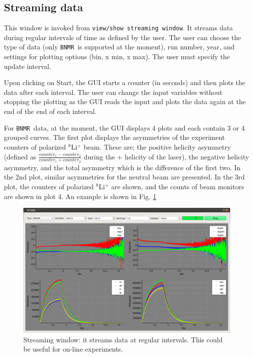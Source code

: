 \documentclass[10pt,letterpaper,oneside]{article}
\newcommand{\bnmrg}{\texttt{BNMR}}
\newcommand{\fig}[1]{Fig. \ref{#1}}
\begin{document}
\newpage
\subsection{Streaming data}\label{Streaming data}
 This window is invoked from \verb+view/show streaming window+.
 It streams data during regular intervals of time as defined by the user.
The user can choose the type of data (only \bnmrg\ is supported at the moment), run number, year, and settings for plotting options (bin, x min, x max).
The user must specify the update interval.

Upon clicking on Start, the GUI starts a counter (in seconds) and then 
plots the data after each interval. The user can change the input variables without stopping the plotting as the GUI reads the input and plots the data again at the end of the end of each interval. 

For \bnmrg\ data, at the moment, the GUI displays 4
plots and each contain 3 or 4 grouped curves. The first plot displays
the asymmetries of the experiment counters of polarized ${}^8$Li$^+$ beam. These are; the positive helicity asymmetry (defined as $\frac{counter_1 -counter_2}{counter_1+counter_2}$ during the + helicity of the laser), the negative helicity asymmetry, and the total asymmetry which is the difference of the first two. In the 2nd plot, similar asymmetries for the neutral beam are presented. In the 3rd plot, the counters of polarized ${}^8$Li$^+$ are shown, and the counts of beam monitors are shown in plot 4. An example is shown in \fig{fig-stream}

\begin{figure}[h]
\includegraphics[width=\textwidth]{stream.png}
 \caption{Streaming window: it streams data at regular intervals. This could be useful for on-line experiments. }
 \label{fig-stream}
 \end{figure}
\newpage
\end{document}

